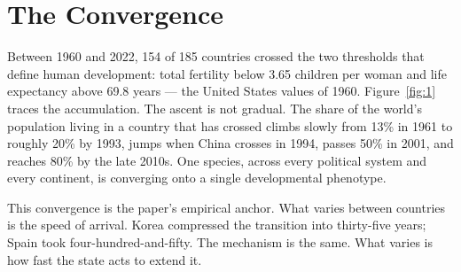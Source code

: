 \documentclass[12pt,letterpaper]{article}
\begin{document}
\begin{titlepage}
\begin{abstract}
A great-grandparent's school completion predicts their
great-grandchild's life expectancy three generations later; income's
predictive power collapses within one. Income, once education's
contribution is removed, predicts nothing. Provision without educated
populations produces no durable outcomes. Institutions are built by
educated populations, not the reverse. Darwin's theory explained how
species differentiate; this paper documents the inverse --- the
convergence of one species, across every political system and
continent, onto the same developmental phenotype through a single
biological channel.

\vspace{0.5em}
\noindent\textbf{Keywords:} extended juvenile dependency; cultural
transmission; parental transmission; categorical literacy;
residualization; natural experiments; development threshold
\end{abstract}

\thispagestyle{empty}
\end{titlepage}

\setcounter{page}{2}

\newpage

\section{The Convergence}\label{the-convergence}

Between 1960 and 2022, 154 of 185 countries crossed the two thresholds
that define human development: total fertility below 3.65 children per
woman and life expectancy above 69.8 years --- the United States
values of 1960. Figure~\ref{fig:1} traces the accumulation. The ascent
is not gradual. The share of the world's population living in a
country that has crossed climbs slowly from 13\% in 1961 to roughly
20\% by 1993, jumps when China crosses in 1994, passes 50\% in 2001,
and reaches 80\% by the late 2010s. One species, across every
political system and every continent, is converging onto a single
developmental phenotype.

This convergence is the paper's empirical anchor. What varies between
countries is the speed of arrival. Korea compressed the transition
into thirty-five years; Spain took four-hundred-and-fifty. The
mechanism is the same. What varies is how fast the state acts to
extend it.
\end{document}
